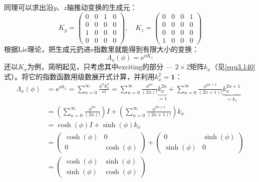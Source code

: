 同理可以求出沿$y$、$z$轴推动变换的生成元：
\begin{equation}
\label{equ3.142}
	K_y =
		\begin{pmatrix}
			0 & 0 & 1 & 0 \\
			0 & 0 & 0 & 0 \\
			1 & 0 & 0 & 0 \\
			0 & 0 & 0 & 0
		\end{pmatrix}
	, \quad
	K_z =
		\begin{pmatrix}
			0 & 0 & 0 & 1 \\
			0 & 0 & 0 & 0 \\
			0 & 0 & 0 & 0 \\
			1 & 0 & 0 & 0
		\end{pmatrix}
\end{equation}
根据Lie理论，把生成元扔进$\mathrm{e}$指数里就能得到有限大小的变换：
\[
	\Lambda_x(\phi) = \mathrm{e}^{\phi K_x}
\]
还以$K_x$为例，简明起见，只考虑其中exciting的部分 --- $2 \times 2$矩阵$k_x$（见\eqref{equ3.140}式）。将它的指数函数用级数展开式计算，并利用$k_x^2 = \mathbf{1}$：
\begin{align}
	\Lambda_x(\phi) &= \mathrm{e}^{\phi k_x} = \sum_{n = 0}^{\infty} \frac{\phi^n k_x^n}{n!} = \sum_{n = 0}^{\infty} \frac{\phi^{2n}}{(2n)!} \underbrace{k_x^{2n}}_{=1} + \sum_{n = 0}^{\infty} \frac{\phi^{2n + 1}}{(2n + 1)!} \underbrace{k_x^{2n + 1}}_{=k_x} \nonumber \\
	&= \left( \sum_{n = 0}^{\infty} \frac{\phi^{2n}}{(2n)!} \right) I + \left( \sum_{n = 0}^{\infty} \frac{\phi^{2n + 1}}{(2n + 1)!} \right) k_x \nonumber \\
	&= \cosh(\phi) I + \sinh(\phi) k_x \nonumber \\
	\label{equ3.143}
	&=
		\begin{pmatrix}
			\cosh(\phi) & 0 \\
			0 & \cosh(\phi)
		\end{pmatrix}
	+
		\begin{pmatrix}
			0 & \sinh(\phi) \\
			\sinh(\phi) & 0
		\end{pmatrix} \nonumber \\
	&=
		\begin{pmatrix}
			\cosh(\phi) & \sinh(\phi) \\
			\sinh(\phi) & \cosh(\phi)
		\end{pmatrix}
\end{align}
